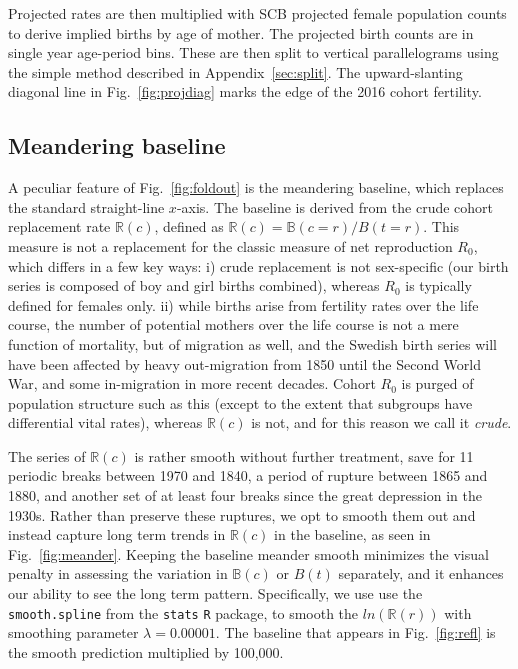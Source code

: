 Projected rates are then multiplied with SCB projected female population counts to derive implied births by age of mother. The projected birth counts are in single year age-period bins. These are then split to vertical parallelograms using the simple method described in Appendix~\ref{sec:split}. The upward-slanting diagonal line in Fig.~\ref{fig:projdiag} marks the edge of the 2016 cohort fertility.


\FloatBarrier
\subsection{Meandering baseline}
\label{sec:baseline}
A peculiar feature of Fig.~\ref{fig:foldout} is the meandering baseline, which replaces the standard straight-line $x$-axis. The baseline is derived from the crude cohort replacement rate $\mathbb{R}(c)$, defined as $\mathbb{R}(c) = \mathbb{B}(c=r) / B(t=r)$. This measure is not a replacement for the classic measure of net reproduction $R_0$, which differs in a few key ways: i) crude replacement is not sex-specific (our birth series is composed of boy and girl births combined), whereas $R_0$ is typically defined for females only. ii) while births arise from fertility rates over the life course, the number of potential mothers over the life course is not a mere function of mortality, but of migration as well, and the Swedish birth series will have been affected by heavy out-migration from 1850 until the Second World War, and some in-migration in more recent decades. Cohort $R_0$ is purged of population structure such as this (except to the extent that subgroups have differential vital rates), whereas $\mathbb{R}(c)$ is not, and for this reason we call it \emph{crude}.

The series of $\mathbb{R}(c)$ is rather smooth without further treatment, save for 11 periodic breaks between 1970 and 1840, a period of rupture between 1865 and 1880, and another set of at least four breaks since the great depression in the 1930s. Rather than preserve these ruptures, we opt to smooth them out and instead capture long term trends in $\mathbb{R}(c)$ in the baseline, as seen in Fig.~\ref{fig:meander}. Keeping the baseline meander smooth minimizes the visual penalty in assessing the variation in $\mathbb{B}(c)$ or $B(t)$ separately, and it enhances our ability to see the long term pattern. Specifically, we use use the \texttt{smooth.spline} from the \texttt{stats} \texttt{R} package, to smooth the $ln(\mathbb{R}(r))$ with smoothing parameter $\lambda = 0.00001$. The baseline that appears in Fig.~\ref{fig:refl} is the smooth prediction multiplied by 100,000.

